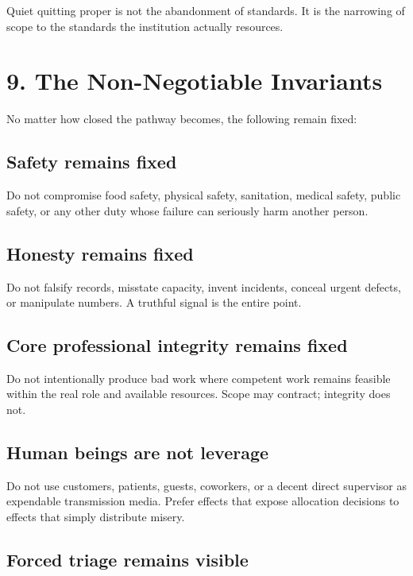 \documentclass[11pt,oneside]{article}
\begin{document}
Quiet quitting proper is not the abandonment of standards. It is the
narrowing of scope to the standards the institution actually resources.

\section{9. The Non-Negotiable
Invariants}\label{the-non-negotiable-invariants}

No matter how closed the pathway becomes, the following remain fixed:

\subsection{Safety remains fixed}\label{safety-remains-fixed}

Do not compromise food safety, physical safety, sanitation, medical
safety, public safety, or any other duty whose failure can seriously
harm another person.

\subsection{Honesty remains fixed}\label{honesty-remains-fixed}

Do not falsify records, misstate capacity, invent incidents, conceal
urgent defects, or manipulate numbers. A truthful signal is the entire
point.

\subsection{Core professional integrity remains
fixed}\label{core-professional-integrity-remains-fixed}

Do not intentionally produce bad work where competent work remains
feasible within the real role and available resources. Scope may
contract; integrity does not.

\subsection{Human beings are not
leverage}\label{human-beings-are-not-leverage}

Do not use customers, patients, guests, coworkers, or a decent direct
supervisor as expendable transmission media. Prefer effects that expose
allocation decisions to effects that simply distribute misery.

\subsection{Forced triage remains
visible}\label{forced-triage-remains-visible}
\end{document}
